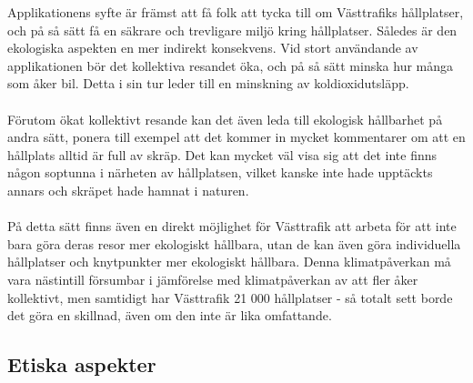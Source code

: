 \documentclass{article}
\begin{document}
Applikationens syfte är främst att få folk att tycka till om Västtrafiks hållplatser, och på så sätt få en säkrare och trevligare miljö kring hållplatser. Således är den ekologiska aspekten en mer indirekt konsekvens. Vid stort användande av applikationen bör det kollektiva resandet öka, och på så sätt minska hur många som åker bil. Detta i sin tur leder till en minskning av koldioxidutsläpp.
\\\\
Förutom ökat kollektivt resande kan det även leda till ekologisk hållbarhet på andra sätt, ponera till exempel att det kommer in mycket kommentarer om att en hållplats alltid är full av skräp. Det kan mycket väl visa sig att det inte finns någon soptunna i närheten av hållplatsen, vilket kanske inte hade upptäckts annars och skräpet hade hamnat i naturen. 
\\\\
På detta sätt finns även en direkt möjlighet för Västtrafik att arbeta för att inte bara göra deras resor mer ekologiskt hållbara, utan de kan även göra individuella hållplatser och knytpunkter mer ekologiskt hållbara. Denna klimatpåverkan må vara nästintill försumbar i jämförelse med klimatpåverkan av att fler åker kollektivt, men samtidigt har Västtrafik 21 000 hållplatser - så totalt sett borde det göra en skillnad, även om den inte är lika omfattande. 

\subsection*{Etiska aspekter}
\end{document}
